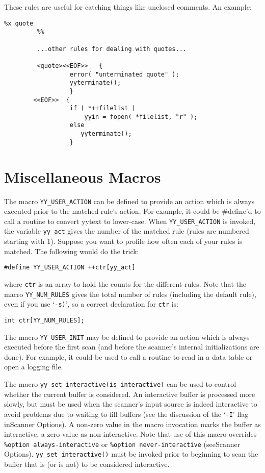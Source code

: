\documentclass[openany,oneside]{book}
\begin{document}
These rules are useful for catching things like unclosed comments.  An
example:


\begin{verbatim}
%x quote
         %%
     
         ...other rules for dealing with quotes...
     
         <quote><<EOF>>   {
                  error( "unterminated quote" );
                  yyterminate();
                  }
        <<EOF>>  {
                  if ( *++filelist )
                      yyin = fopen( *filelist, "r" );
                  else
                     yyterminate();
                  }
\end{verbatim}

\chapter{Miscellaneous Macros}


The macro \verb`YY_USER_ACTION` can be defined to provide an action
which is always executed prior to the matched rule's action.  For
example, it could be \#{}define'd to call a routine to convert yytext to
lower-case.  When \verb`YY_USER_ACTION` is invoked, the variable \verb`yy_act` gives the number of the matched rule (rules are numbered
starting with 1).  Suppose you want to profile how often each of your
rules is matched.  The following would do the trick:


\begin{verbatim}
#define YY_USER_ACTION ++ctr[yy_act]
\end{verbatim}


where \verb`ctr` is an array to hold the counts for the different rules. 
Note that the macro \verb`YY_NUM_RULES` gives the total number of rules
(including the default rule), even if you use ‘\verb`-s)`’, so a correct
declaration for \verb`ctr` is:
\begin{verbatim}
int ctr[YY_NUM_RULES];
\end{verbatim}


The macro \verb`YY_USER_INIT` may be defined to provide an action which
is always executed before the first scan (and before the scanner's
internal initializations are done).  For example, it could be used to
call a routine to read in a data table or open a logging file.

The macro \verb`yy_set_interactive(is_interactive)` can be used to
control whether the current buffer is considered.  An
interactive buffer is processed more slowly, but must be used when the
scanner's input source is indeed interactive to avoid problems due to
waiting to fill buffers (see the discussion of the ‘\verb`-I`’ flag inScanner Options).  A non-zero value in the macro invocation marks
the buffer as interactive, a zero value as non-interactive.  Note that
use of this macro overrides \verb`%option always-interactive` or \verb`%option never-interactive` (seeScanner Options). \verb`yy_set_interactive()` must be invoked prior to beginning to scan
the buffer that is (or is not) to be considered interactive.
\end{document}
